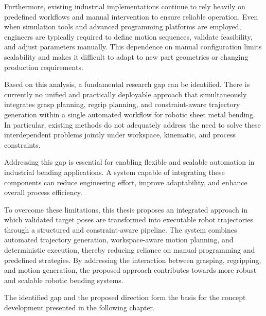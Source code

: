 Furthermore, existing industrial implementations continue to rely heavily on predefined workflows and manual intervention to ensure reliable operation. Even when simulation tools and advanced programming platforms are employed, engineers are typically required to define motion sequences, validate feasibility, and adjust parameters manually. This dependence on manual configuration limits scalability and makes it difficult to adapt to new part geometries or changing production requirements.

Based on this analysis, a fundamental research gap can be identified. There is currently no unified and practically deployable approach that simultaneously integrates grasp planning, regrip planning, and constraint-aware trajectory generation within a single automated workflow for robotic sheet metal bending. In particular, existing methods do not adequately address the need to solve these interdependent problems jointly under workspace, kinematic, and process constraints.

Addressing this gap is essential for enabling flexible and scalable automation in industrial bending applications. A system capable of integrating these components can reduce engineering effort, improve adaptability, and enhance overall process efficiency.

To overcome these limitations, this thesis proposes an integrated approach in which validated target poses are transformed into executable robot trajectories through a structured and constraint-aware pipeline. The system combines automated trajectory generation, workspace-aware motion planning, and deterministic execution, thereby reducing reliance on manual programming and predefined strategies. By addressing the interaction between grasping, regripping, and motion generation, the proposed approach contributes towards more robust and scalable robotic bending systems.

The identified gap and the proposed direction form the basis for the concept development presented in the following chapter.
